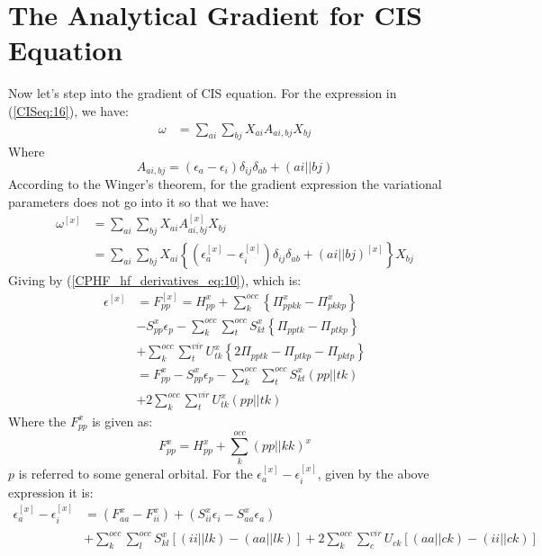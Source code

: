 \section{The Analytical Gradient for CIS Equation}
%
%
%
%
Now let's step into the gradient of CIS equation. For the expression in
(\ref{CISeq:16}), we have:
\begin{align}
 \label{CIS_gradient:1}
\omega &= \sum_{ai}\sum_{bj}X_{ai}A_{ai,bj}X_{bj} 
\end{align}
Where 
\begin{equation}
 A_{ai,bj} = (\epsilon_{a} - \epsilon_{i})\delta_{ij}\delta_{ab} +
(ai||bj)
\end{equation}
According to the Winger's theorem, for the gradient expression the variational
parameters does not go into it so that we have:
\begin{align}
\label{CIS_gradient:2}
 \omega^{[x]} &= \sum_{ai}\sum_{bj}X_{ai}A^{[x]}_{ai,bj}X_{bj} \nonumber \\
&=   \sum_{ai}\sum_{bj}X_{ai} \left\lbrace( \epsilon^{[x]}_{a} -
\epsilon^{[x]}_{i})\delta_{ij}\delta_{ab} +
(ai||bj)^{[x]}\right\rbrace X_{bj}
\end{align}
Giving by (\ref{CPHF_hf_derivatives_eq:10}), which is:
\begin{align}
  \label{CIS_gradient:3}
  \epsilon^{[x]} &= F_{pp}^{[x]} = H^{x}_{pp} + \sum_{k}^{occ}\left
\{\Pi^{x}_{ppkk} -
    \Pi^{x}_{pkkp} \right\}
  \nonumber \\
  &- S^{x}_{pp}\epsilon_{p} - \sum_{k}^{occ}\sum_{t}^{occ}S^{x}_{kt}
  \left\{ \Pi_{pptk} - \Pi_{ptkp} \right\} \nonumber \\
  &+ \sum_{k}^{occ}\sum_{t}^{vir}U^{x}_{tk}\left\{ 2\Pi_{pptk} -
    \Pi_{ptkp} - \Pi_{pktp} \right\} \nonumber \\
&= F^{x}_{pp} - S^{x}_{pp}\epsilon_{p}
 - \sum_{k}^{occ}\sum_{t}^{occ}S^{x}_{kt}(pp||tk) \nonumber \\
&+2\sum_{k}^{occ}\sum_{t}^{vir}U^{x}_{tk}(pp||tk) 
\end{align}
Where the $F^{x}_{pp} $ is given as:
\begin{equation}
 \label{CIS_gradient:10}
F^{x}_{pp} = H^{x}_{pp} + \sum_{k}^{occ}(pp||kk)^{x}
\end{equation}
$p$ is referred to some general orbital.  For the $\epsilon^{[x]}_{a} -
\epsilon^{[x]}_{i}$, given by the above expression it is:
\begin{equation}
 \begin{split}
\epsilon^{[x]}_{a} - \epsilon^{[x]}_{i} &=  (F^{x}_{aa} -
F^{x}_{ii}) +
(S^{x}_{ii}\epsilon_{i} - S^{x}_{aa}\epsilon_{a})  \\
&+\sum_{k}^{occ}\sum_{l}^{occ}S_{kl}^{x}[(ii||lk) -
(aa||lk)] +  2\sum_{k}^{occ}\sum_{c}^{vir}U_{ck}[(aa||ck) - (ii||ck)]
 \end{split}
\label{CIS_gradient:11}
\end{equation}

